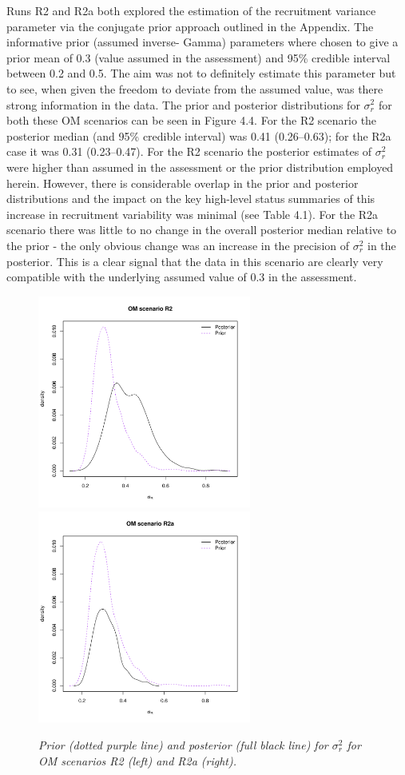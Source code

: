 \documentclass[12pt,a4paper,twoside,times,sky,standard]{csiroreport2017}
\newcommand{\sigr}{\sigma^2_r}
\begin{document}
Runs R2 and R2a both explored the estimation of the recruitment variance parameter via the
conjugate prior approach outlined in the Appendix. The informative prior (assumed inverse-
Gamma) parameters where chosen to give a prior mean of 0.3 (value assumed in the assessment) and 95\% credible interval between 0.2 and 0.5. The aim was not to definitely estimate this parameter but to see, when given the freedom to deviate from the assumed value, was there strong information in the data. The prior and posterior distributions for $\sigr$ for both these OM scenarios can be seen in Figure 4.4. For the R2 scenario the posterior median (and 95\% credible interval) was 0.41 (0.26--0.63); for the R2a case it was 0.31 (0.23--0.47). For the R2 scenario the posterior estimates of $\sigr$ were higher than assumed in the assessment or the prior distribution employed herein. However, there is considerable overlap in the prior and posterior distributions and the impact on the key high-level status summaries of this increase in recruitment variability was minimal (see Table 4.1). For the R2a scenario there was little to no change in the overall posterior median relative to the prior - the only obvious change was an increase in the precision of $\sigr$ in the posterior. This is a clear signal that the data in this scenario are clearly very compatible with the underlying assumed value of 0.3 in the assessment.

\begin{figure}[hb]
    \begin{center}
       \includegraphics[width=7cm,height=7cm]{figs/pvsp_sigmar_R2.pdf}\includegraphics[width=7cm,height=7cm]{figs/pvsp_sigmar_R2a.pdf} 
    \end{center}
    \caption{\textit{Prior (dotted purple line) and posterior (full black line) for $\sigr$ for OM scenarios R2 (left) and R2a (right).}}
\end{figure}
\end{document}

